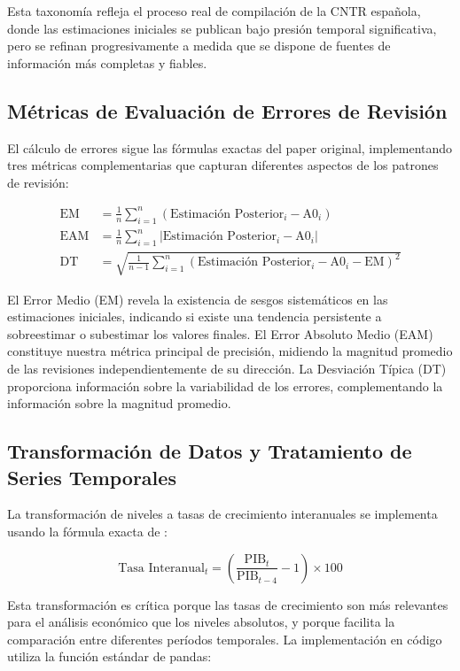 \documentclass{article}
\begin{document}
Esta taxonomía refleja el proceso real de compilación de la CNTR española, donde las estimaciones iniciales se publican bajo presión temporal significativa, pero se refinan progresivamente a medida que se dispone de fuentes de información más completas y fiables.

\subsection{Métricas de Evaluación de Errores de Revisión}

El cálculo de errores sigue las fórmulas exactas del paper original, implementando tres métricas complementarias que capturan diferentes aspectos de los patrones de revisión:

\begin{align}
\text{EM} &= \frac{1}{n}\sum_{i=1}^{n}(\text{Estimación Posterior}_i - \text{A0}_i) \label{eq:em}\\
\text{EAM} &= \frac{1}{n}\sum_{i=1}^{n}|\text{Estimación Posterior}_i - \text{A0}_i| \label{eq:eam}\\
\text{DT} &= \sqrt{\frac{1}{n-1}\sum_{i=1}^{n}(\text{Estimación Posterior}_i - \text{A0}_i - \text{EM})^2} \label{eq:dt}
\end{align}

El Error Medio (EM) revela la existencia de sesgos sistemáticos en las estimaciones iniciales, indicando si existe una tendencia persistente a sobreestimar o subestimar los valores finales. El Error Absoluto Medio (EAM) constituye nuestra métrica principal de precisión, midiendo la magnitud promedio de las revisiones independientemente de su dirección. La Desviación Típica (DT) proporciona información sobre la variabilidad de los errores, complementando la información sobre la magnitud promedio.

\subsection{Transformación de Datos y Tratamiento de Series Temporales}

La transformación de niveles a tasas de crecimiento interanuales se implementa usando la fórmula exacta de \citet{pavia2017}:

\begin{equation}
\text{Tasa Interanual}_t = \left(\frac{\text{PIB}_t}{\text{PIB}_{t-4}} - 1\right) \times 100
\end{equation}

Esta transformación es crítica porque las tasas de crecimiento son más relevantes para el análisis económico que los niveles absolutos, y porque facilita la comparación entre diferentes períodos temporales. La implementación en código utiliza la función estándar de pandas:
\end{document}
